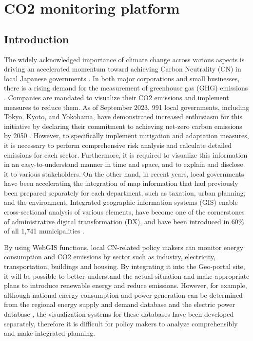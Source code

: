 \chapter{CO2 monitoring platform}
\renewcommand{\headrulewidth}{0pt}
\lhead[\thepage]{\leftmark}
\rhead[\leftmark]{\thepage}
\cfoot[]{}

\section{Introduction}

The widely acknowledged importance of climate change across various aspects \citep{primack2009impact, watanabe2009general, ogawa2013ecological, shibuya2016effect} is driving an accelerated momentum toward achieving Carbon Neutrality (CN) in local Japanese governments \citep{nakazawa2023net}. In both major corporations and small businesses, there is a rising demand for the measurement of greenhouse gas (GHG) emissions \citep{kauffmann2012corporate}. Companies are mandated to visualize their CO2 emissions and implement measures to reduce them. As of September 2023, 991 local governments, including Tokyo, Kyoto, and Yokohama, have demonstrated increased enthusiasm for this initiative by declaring their commitment to achieving net-zero carbon emissions by 2050 \citep{zerocarboncities}. However, to specifically implement mitigation and adaptation measures, it is necessary to perform comprehensive risk analysis and calculate detailed emissions for each sector. Furthermore, it is required to visualize this information in an easy-to-understand manner in time and space, and to explain and disclose it to various stakeholders. On the other hand, in recent years, local governments have been accelerating the integration of map information that had previously been prepared separately for each department, such as taxation, urban planning, and the environment. Integrated geographic information systems (GIS) enable cross-sectional analysis of various elements, have become one of the cornerstones of administrative digital transformation (DX), and have been introduced in 60\% of all 1,741 municipalities \citep{nikkei}.\par

By using WebGIS functions, local CN-related policy makers can monitor energy consumption and CO2 emissions by sector such as industry, electricity, transportation, buildings and housing. By integrating it into the Geo-portal site, it will be possible to better understand the actual situation and make appropriate plans to introduce renewable energy and reduce emissions. However, for example, although national energy consumption and power generation can be determined from the regional energy supply and demand database \citep{Toshihiko} and the electric power database \citep{kitamoto, nlftp}, the visualization systems for these databases have been developed separately, therefore it is difficult for policy makers to analyze comprehensibly and make integrated planning.\par

